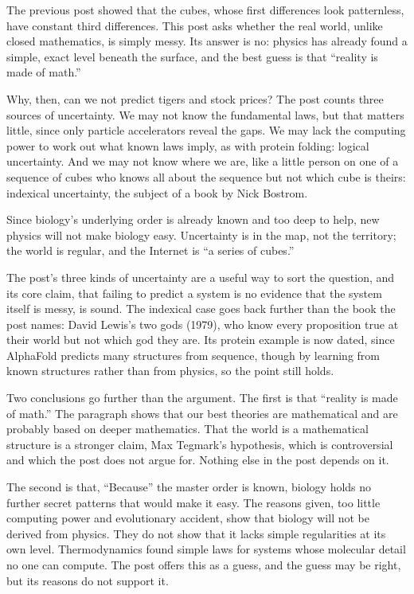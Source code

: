 \begin{afterword}
\summaryhead

The previous post showed that the cubes, whose first differences look patternless, have constant third differences. This post asks whether the real world, unlike closed mathematics, is simply messy. Its answer is no: physics has already found a simple, exact level beneath the surface, and the best guess is that ``reality is made of math.''

Why, then, can we not predict tigers and stock prices? The post counts three sources of uncertainty. We may not know the fundamental laws, but that matters little, since only particle accelerators reveal the gaps. We may lack the computing power to work out what known laws imply, as with protein folding: logical uncertainty. And we may not know where we are, like a little person on one of a sequence of cubes who knows all about the sequence but not which cube is theirs: indexical uncertainty, the subject of a book by Nick Bostrom.

Since biology's underlying order is already known and too deep to help, new physics will not make biology easy. Uncertainty is in the map, not the territory; the world is regular, and the Internet is ``a series of cubes.''

\responsehead

The post's three kinds of uncertainty are a useful way to sort the question, and its core claim, that failing to predict a system is no evidence that the system itself is messy, is sound. The indexical case goes back further than the book the post names: David Lewis's two gods (1979), who know every proposition true at their world but not which god they are. Its protein example is now dated, since AlphaFold predicts many structures from sequence, though by learning from known structures rather than from physics, so the point still holds.

Two conclusions go further than the argument. The first is that ``reality is made of math.'' The paragraph shows that our best theories are mathematical and are probably based on deeper mathematics. That the world is a mathematical structure is a stronger claim, Max Tegmark's hypothesis, which is controversial and which the post does not argue for. Nothing else in the post depends on it.

The second is that, ``Because'' the master order is known, biology holds no further secret patterns that would make it easy. The reasons given, too little computing power and evolutionary accident, show that biology will not be derived from physics. They do not show that it lacks simple regularities at its own level. Thermodynamics found simple laws for systems whose molecular detail no one can compute. The post offers this as a guess, and the guess may be right, but its reasons do not support it.


\end{afterword}

